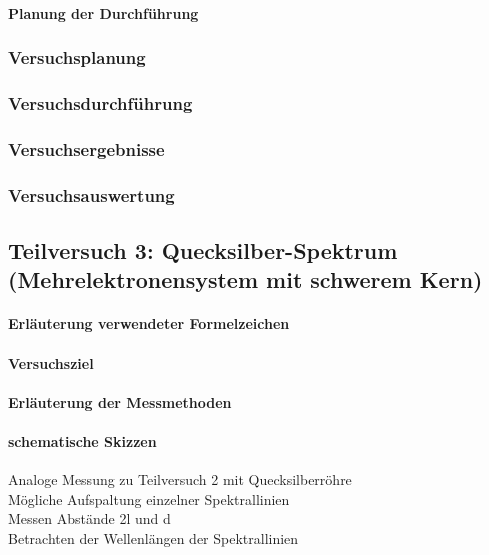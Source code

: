 \documentclass[12pt,oneside,oldfontcommands]{memoir}
\begin{document}
\paragraph{Planung der Durchführung}
\subsubsection{Versuchsplanung}
\subsubsection{Versuchsdurchführung}
\subsubsection{Versuchsergebnisse}
\subsubsection{Versuchsauswertung}

\subsection{Teilversuch 3: Quecksilber-Spektrum (Mehrelektronensystem mit schwerem
Kern)}
\paragraph{Erläuterung verwendeter Formelzeichen}
\paragraph{Versuchsziel}
\paragraph{Erläuterung der Messmethoden}
\paragraph{schematische Skizzen}

Analoge Messung zu Teilversuch 2 mit Quecksilberröhre\\

Mögliche Aufspaltung einzelner Spektrallinien\\

Messen Abstände 2l und d\\

Betrachten der Wellenlängen der Spektrallinien\\
\end{document}
